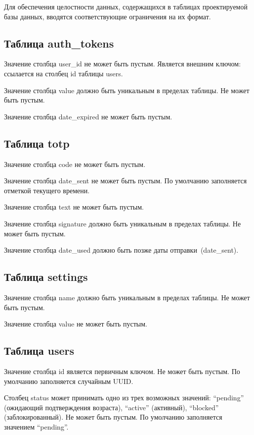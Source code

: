 Для обеспечения целостности данных, содержащихся в таблицах проектируемой базы данных, вводятся соответствующие ограничения на их формат.

\subsection*{Таблица auth\_tokens}

Значение столбца user\_id не может быть пустым. Является внешним ключом: ссылается на столбец id таблицы users.

Значение столбца value должно быть уникальным в пределах таблицы. Не может быть пустым.

Значение столбца date\_expired не может быть пустым.

\subsection*{Таблица totp}

Значение столбца code не может быть пустым.

Значение столбца date\_sent не может быть пустым. По умолчанию заполняется отметкой текущего времени.

Значение столбца text не может быть пустым.

Значение столбца signature должно быть уникальным в пределах таблицы. Не может быть пустым.

Значение столбца date\_used должно быть позже даты отправки~(date\_sent).

\subsection*{Таблица settings}

Значение столбца name должно быть уникальным в пределах таблицы. Не может быть пустым.

Значение столбца value не может быть пустым.

\subsection*{Таблица users}

Значение столбца id является первичным ключом. Не может быть пустым. По умолчанию заполняется случайным UUID.

Столбец status может принимать одно из трех возможных значений: \enquote{pending} (ожидающий подтверждения возраста), \enquote{active} (активный), \enquote{blocked} (заблокированный). Не может быть пустым. По умолчанию заполняется значением \enquote{pending}.

